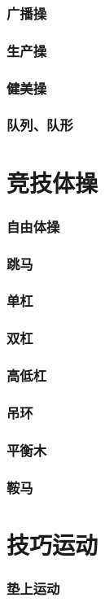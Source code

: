\documentclass[UTF8]{../../ApplicationUniverse}
\begin{document}
    \subsubsection{广播操}
    \subsubsection{生产操}
    \subsubsection{健美操}
    \subsubsection{队列、队形}
\section{竞技体操}
    \subsubsection{自由体操}
    \subsubsection{跳马}
    \subsubsection{单杠}
    \subsubsection{双杠}
    \subsubsection{高低杠}
    \subsubsection{吊环}
    \subsubsection{平衡木}
    \subsubsection{鞍马}
\section{技巧运动}
    \subsubsection{垫上运动}
\end{document}
